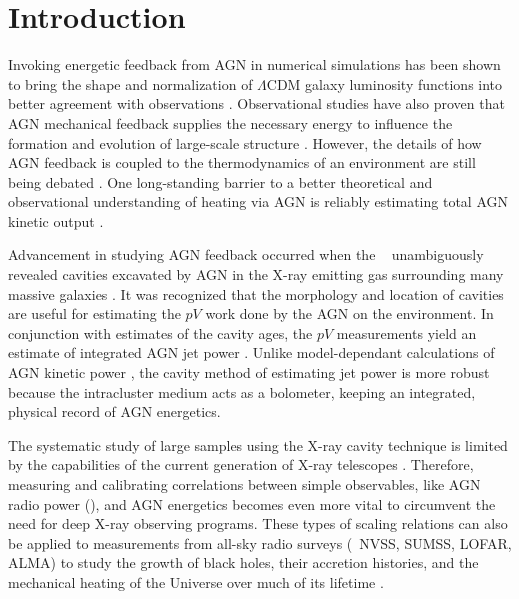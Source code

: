 \documentclass{emulateapj}
\begin{document}


\section{Introduction}
\label{sec:intro}

Invoking energetic feedback from AGN in numerical simulations has been
shown to bring the shape and normalization of $\Lambda$CDM galaxy
luminosity functions into better agreement with observations
\citep{croton06, bower06, saro06, sijacki07}. Observational studies
have also proven that AGN mechanical feedback supplies the necessary
energy to influence the formation and evolution of large-scale
structure \citep{birzan04, 2005MNRAS.364.1343D, rafferty06, dunn08,
  birzan08}. However, the details of how AGN feedback is coupled to
the thermodynamics of an environment are still being debated
\citep{2008ASPC..386..343D, 2009arXiv0910.3691M}. One long-standing
barrier to a better theoretical and observational understanding of
heating via AGN is reliably estimating total AGN kinetic output
\citep[\eg][]{1973MNRAS.164..243L, 1991Natur.349..138R,
  1996AJ....112....9L}.

Advancement in studying AGN feedback occurred when the
\cxo\ \citep{chandra} unambiguously revealed cavities excavated by AGN
in the X-ray emitting gas surrounding many massive galaxies
\citep[\eg][]{2000ApJ...534L.135M, perseus1, schindler01}. It was
recognized that the morphology and location of cavities are useful for
estimating the $pV$ work done by the AGN on the environment. In
conjunction with estimates of the cavity ages, the $pV$ measurements
yield an estimate of integrated AGN jet power \citep[see][for a
  review]{mcnamrev}. Unlike model-dependant calculations of AGN
kinetic power \citep[\eg][]{1999MNRAS.309.1017W}, the cavity method of
estimating jet power is more robust because the intracluster medium
acts as a bolometer, keeping an integrated, physical record of AGN
energetics.

The systematic study of large samples using the X-ray cavity technique
is limited by the capabilities of the current generation of X-ray
telescopes \citep{2009arXiv0909.0397B}. Therefore, measuring and
calibrating correlations between simple observables, like AGN radio
power (\prad), and AGN energetics becomes even more vital to
circumvent the need for deep X-ray observing programs. These types of
scaling relations can also be applied to measurements from all-sky
radio surveys (\eg\ NVSS, SUMSS, LOFAR, ALMA) to study the growth of
black holes, their accretion histories, and the mechanical heating of
the Universe over much of its lifetime \citep{croton06,
  2006MNRAS.366..397S, 2009MNRAS.395..518C}.
\end{document}
